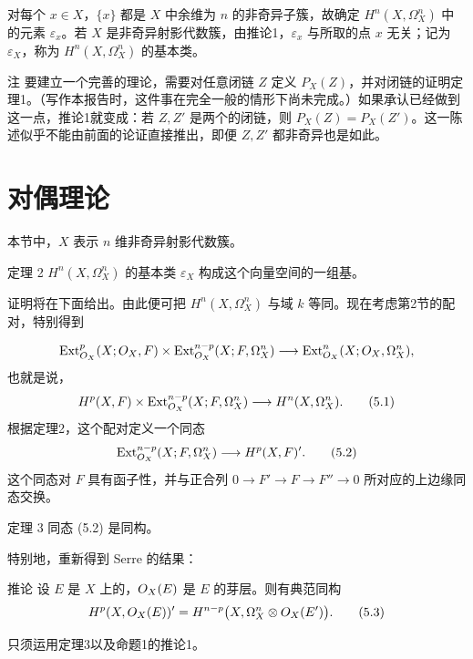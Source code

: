 对每个 $x\in X$，$\{x\}$ 都是 $X$ 中余维为 $n$ 的非奇异子簇，故确定 $H^n(X,\Omega_X^n)$ 中的元素 $\varepsilon_x$。若 $X$ 是非奇异射影代数簇，由推论1，$\varepsilon_x$ 与所取的点 $x$ 无关；记为 $\varepsilon_X$，称为 $H^n(X,\Omega_X^n)$ 的基本类。

\begin{statement}{注}
要建立一个完善的理论，需要对任意闭链 $Z$ 定义 $P_X(Z)$，并对闭链的证明定理1。（写作本报告时，这件事在完全一般的情形下尚未完成。）如果承认已经做到这一点，推论1就变成：若 $Z,Z'$ 是两个的闭链，则 $P_X(Z)=P_X(Z')$。这一陈述似乎不能由前面的论证直接推出，即便 $Z,Z'$ 都非奇异也是如此。
\end{statement}

\section{对偶理论}
本节中，$X$ 表示 $n$ 维非奇异射影代数簇。
\begin{statement}{定理 2}
$H^n(X,\Omega_X^n)$ 的基本类 $\varepsilon_X$ 构成这个向量空间的一组基。
\end{statement}
证明将在下面给出。由此便可把 $H^n(X,\Omega_X^n)$ 与域 $k$ 等同。现在考虑第2节的配对，特别得到

\[
\operatorname{Ext}_{O_X}^{p}(X;O_X,F)\times
\operatorname{Ext}_{O_X}^{n-p}(X;F,\Omega_X^n)
\longrightarrow\operatorname{Ext}_{O_X}^{n}(X;O_X,\Omega_X^n),
\]
也就是说，
\begin{equation}
H^p(X,F)\times\operatorname{Ext}_{O_X}^{n-p}(X;F,\Omega_X^n)
\longrightarrow H^n(X,\Omega_X^n).
\tag{5.1}
\end{equation}
根据定理2，这个配对定义一个同态
\begin{equation}
\operatorname{Ext}_{O_X}^{n-p}(X;F,\Omega_X^n)
\longrightarrow H^p(X,F)'.\tag{5.2}
\end{equation}
这个同态对 $F$ 具有函子性，并与正合列 $0\to F'\to F\to F''\to0$ 所对应的上边缘同态交换。
\begin{statement}{定理 3}
同态 (5.2) 是同构。
\end{statement}
特别地，重新得到 Serre 的结果：
\begin{statement}{推论}
设 $E$ 是 $X$ 上的，$O_X(E)$ 是 $E$ 的芽层。则有典范同构
\begin{equation}
H^p(X,O_X(E))'=H^{n-p}\bigl(X,\Omega_X^n\otimes O_X(E')\bigr).
\tag{5.3}
\end{equation}
\end{statement}
只须运用定理3以及命题1的推论1。

